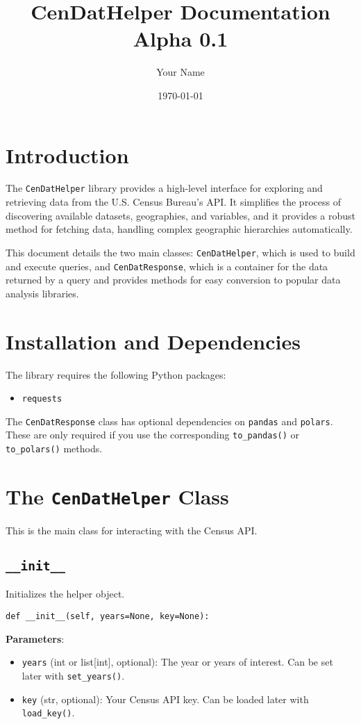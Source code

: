 \documentclass{article}
\title{CenDatHelper Documentation \\ \large Alpha 0.1}
\author{Your Name}
\date{\today}
\begin{document}
\maketitle
\tableofcontents
\newpage

\section{Introduction}
The \texttt{CenDatHelper} library provides a high-level interface for exploring and retrieving data from the U.S. Census Bureau's API. It simplifies the process of discovering available datasets, geographies, and variables, and it provides a robust method for fetching data, handling complex geographic hierarchies automatically.

This document details the two main classes: \texttt{CenDatHelper}, which is used to build and execute queries, and \texttt{CenDatResponse}, which is a container for the data returned by a query and provides methods for easy conversion to popular data analysis libraries.

\section{Installation and Dependencies}
The library requires the following Python packages:
\begin{itemize}
    \item \texttt{requests}
\end{itemize}
The \texttt{CenDatResponse} class has optional dependencies on \texttt{pandas} and \texttt{polars}. These are only required if you use the corresponding \texttt{to\_pandas()} or \texttt{to\_polars()} methods.

\section{The \texttt{CenDatHelper} Class}
This is the main class for interacting with the Census API.

\subsection{\texttt{\_\_init\_\_}}
Initializes the helper object.
\begin{verbatim}
def __init__(self, years=None, key=None):
\end{verbatim}
\textbf{Parameters}:
\begin{itemize}
    \item \texttt{years} (int or list[int], optional): The year or years of interest. Can be set later with \texttt{set\_years()}.
    \item \texttt{key} (str, optional): Your Census API key. Can be loaded later with \texttt{load\_key()}.
\end{itemize}
\end{document}
